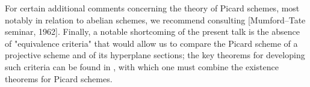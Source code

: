 For certain additional comments concerning the theory of Picard schemes, most notably in relation to abelian schemes, we recommend consulting [Mumford–Tate seminar, 1962].
Finally, a notable shortcoming of the present talk is the absence of "equivalence criteria" that would allow us to compare the Picard scheme of a projective scheme and of its hyperplane sections;
the key theorems for developing such criteria can be found in \cite{Gro1960b}, with which one must combine the existence theorems for Picard schemes.
